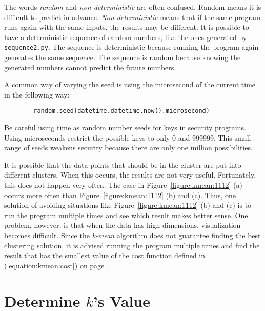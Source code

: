 \resetlinenumber[1]
\linenumbers
\begin{tt}
  
\end{tt}
\nolinenumbers


The words {\it random} and {\it non-deterministic} are often confused.
Random means it is difficult to predict in advance.  {\it
  Non-deterministic} means that if the same program runs again with
the same inputs, the results may be different.  It is possible to have
a deterministic sequence of random numbers, like the ones generated by
{\tt sequence2.py}.  The sequence is deterministic because running the
program again generates the same sequence. The sequence is random
because knowing the generated numbers cannot predict the future
numbers.



A common way of varying the seed is using the microsecond of the
current time in the following way:

\begin{verbatim}
        random.seed(datetime.datetime.now().microsecond)
\end{verbatim}

Be careful using time as random number seeds for keys in security
programs.  Using microseconds restrict the possible keys to only 0 and
999999.  This small range of seeds weakens security because there are
only one million possibilities.

It is possible that the data points that should be in the cluster are
put into different clusters. When this occurs, the results are not
very useful. Fortunately, this does not happen very often.  The case
in Figure~\ref{figure:kmean:1112} (a) occurs more often than
Figure~\ref{figure:kmean:1112} (b) and (c).  Thus, one solution of
avoiding situations like Figure~\ref{figure:kmean:1112} (b) and (c) is
to run the program multiple times and see which result makes better
sense.  One problem, however, is that when the data has high
dimensions, visualization becomes difficult.  Since the {\it k-mean}
algorithm does not guarantee finding the best clustering solution, it
is advised running the program multiple times and find the result that
has the smallest value of the cost function defined in
(\ref{equation:kmean:cost}) on page~\pageref{equation:kmean:cost}.

\section{Determine $k$'s Value}


